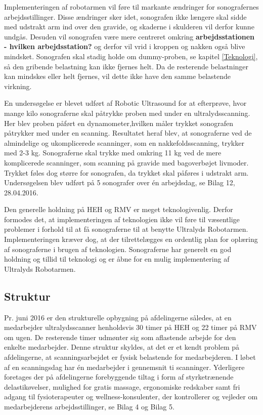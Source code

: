Implementeringen af robotarmen vil føre til markante ændringer for sonografernes arbejdsstillinger. Disse ændringer sker idet, sonografen ikke længere skal sidde med udstrakt arm ind over den gravide, og skaderne i skulderen vil derfor kunne undgås. Desuden vil sonografen være mere centreret omkring \textbf{arbejdsstationen - hvilken arbejdsstation?} og derfor vil vrid i kroppen og nakken også blive mindsket. Sonografen skal stadig holde om dummy-proben, se kapitel \ref{Teknologi}, så den gribende belastning kan ikke fjernes helt. Da de resterende belastninger kan mindskes eller helt fjernes, vil dette ikke have den samme belastende virkning. 

En undersøgelse er blevet udført af Robotic Ultrasound for at efterprøve, hvor mange kilo sonograferne skal påtrykke proben med under en ultralydsscanning. Her blev proben påført en dynamometer,hvilken måler trykket sonografen påtrykker med under en scanning. Resultatet heraf blev, at sonograferne ved de almindelige og ukomplicerede scanninger, som en nakkefoldsscanning, trykker med 2-3 kg. Sonograferne skal trykke med omkring 11 kg ved de mere komplicerede scanninger, som scanning på gravide med bagoverbøjet livmoder. Trykket føles dog større for sonografen, da trykket skal påføres i udstrakt arm. Undersøgelsen blev udført på 5 sonografer over én arbejdsdag, se Bilag 12, 28.04.2016.

Den generelle holdning på HEH og RMV er meget teknologivenlig. Derfor formodes det, at implementeringen af teknologien ikke vil føre til væsentlige problemer i forhold til at få sonograferne til at benytte Ultralyds Robotarmen. Implementeringen kræver dog, at der tilrettelægges en ordentlig plan for oplæring af sonograferne i brugen af teknologien. Sonograferne har generelt en god holdning og tillid til teknologi og er åbne for en mulig implementering af Ultralyds Robotarmen.

\subsection{Struktur}
Pr. juni 2016 er den strukturelle opbygning på afdelingerne således, at en medarbejder ultralydsscanner henholdsvis 30 timer på HEH og 22 timer på RMV om ugen. De resterende timer udmønter sig som aflastende arbejde for den enkelte medarbejder. Denne struktur skyldes, at det er et kendt problem på afdelingerne, at scanningsarbejdet er fysisk belastende for medarbejderen. I løbet af en scanningsdag har én medarbejder i gennemsnit ti scanninger. Yderligere foretages der på afdelingerne forebyggende tiltag i form af styrketrænende delastikøvelser, mulighed for gratis massage, ergonomiske redskaber samt fri adgang til fysioterapeuter og wellness-konsulenter, der kontrollerer og vejleder om medarbejderens arbejdsstillinger, se Bilag 4 og Bilag 5.

